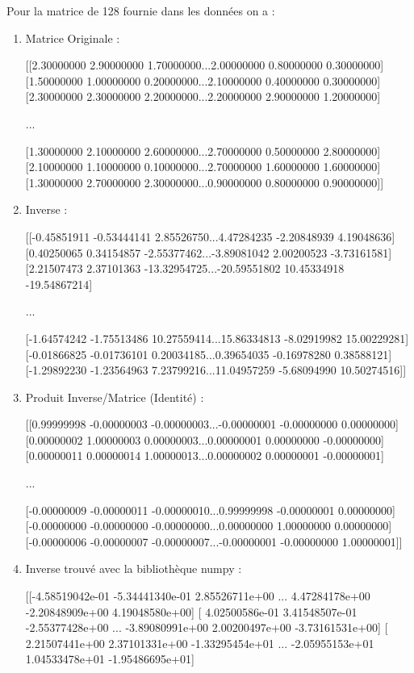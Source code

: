 \documentclass[a4paper,fleqn]{article}
\begin{document}
Pour la matrice de 128 fournie dans les données on a : 
\begin{enumerate}

\item Matrice Originale :

[[2.30000000 2.90000000 1.70000000...2.00000000 0.80000000 0.30000000]
[1.50000000 1.00000000 0.20000000...2.10000000 0.40000000 0.30000000]
[2.30000000 2.30000000 2.20000000...2.20000000 2.90000000 1.20000000]
 
...

 [1.30000000 2.10000000 2.60000000...2.70000000 0.50000000 2.80000000]
 [2.10000000 1.10000000 0.10000000...2.70000000 1.60000000 1.60000000]
 [1.30000000 2.70000000 2.30000000...0.90000000 0.80000000 0.90000000]]
\item Inverse :

[[-0.45851911 -0.53444141 2.85526750...4.47284235 -2.20848939 4.19048636]
[0.40250065 0.34154857 -2.55377462...-3.89081042 2.00200523 -3.73161581]
[2.21507473 2.37101363 -13.32954725...-20.59551802 10.45334918 -19.54867214]
 
...

[-1.64574242 -1.75513486 10.27559414...15.86334813 -8.02919982 15.00229281]
[-0.01866825 -0.01736101 0.20034185...0.39654035 -0.16978280 0.38588121]
[-1.29892230 -1.23564963 7.23799216...11.04957259 -5.68094990 10.50274516]]
 
\item Produit Inverse/Matrice (Identité) :

[[0.99999998 -0.00000003 -0.00000003...-0.00000001 -0.00000000 0.00000000]
[0.00000002 1.00000003 0.00000003...0.00000001 0.00000000 -0.00000000]
[0.00000011 0.00000014 1.00000013...0.00000002 0.00000001 -0.00000001]
 
...

[-0.00000009 -0.00000011 -0.00000010...0.99999998 -0.00000001 0.00000000]
[-0.00000000 -0.00000000 -0.00000000...0.00000000 1.00000000 0.00000000]
[-0.00000006 -0.00000007 -0.00000007...-0.00000001 -0.00000000 1.00000001]]

\item Inverse trouvé avec la bibliothèque numpy :

 [[-4.58519042e-01 -5.34441340e-01  2.85526711e+00 ...  4.47284178e+00
  -2.20848909e+00  4.19048580e+00]
 [ 4.02500586e-01  3.41548507e-01 -2.55377428e+00 ... -3.89080991e+00
   2.00200497e+00 -3.73161531e+00]
 [ 2.21507441e+00  2.37101331e+00 -1.33295454e+01 ... -2.05955153e+01
   1.04533478e+01 -1.95486695e+01]
   

\end{enumerate}
\end{document}
